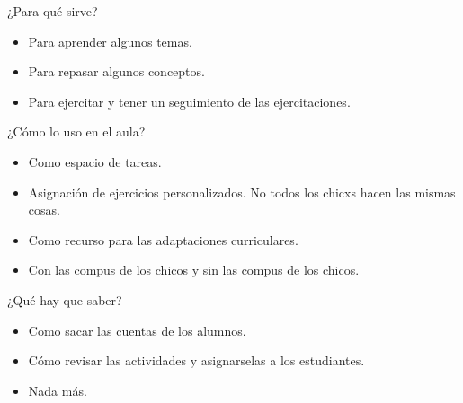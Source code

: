 \documentclass[presentation]{beamer}
\begin{document}
\begin{frame}[label=sec-1-2]{¿Para qué sirve?}
\begin{itemize}
\item Para aprender algunos temas.
\item Para repasar algunos conceptos.
\item Para ejercitar y tener un seguimiento de las ejercitaciones.
\end{itemize}
\begin{block}{¿Cómo lo uso en el aula?}
\begin{itemize}
\item Como espacio de tareas.
\item Asignación de ejercicios personalizados. No todos los chicxs hacen las mismas cosas.
\item Como recurso para las adaptaciones curriculares.
\item Con las compus de los chicos y sin las compus de los chicos.
\end{itemize}
\end{block}

\begin{block}{¿Qué hay que saber?}
\begin{itemize}
\item Como sacar las cuentas de los alumnos.
\item Cómo revisar las actividades y asignarselas a los estudiantes.
\item Nada más.
\end{itemize}
\end{block}
\end{frame}
\end{document}
